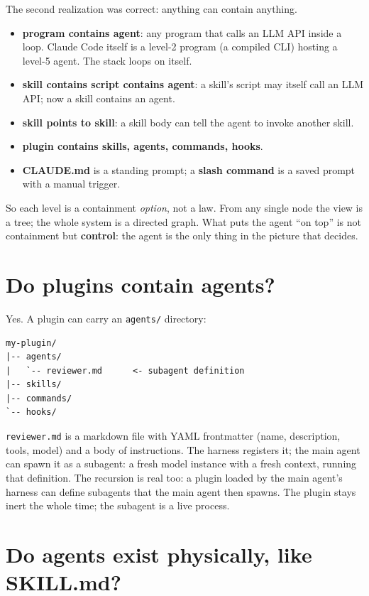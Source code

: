 \documentclass[11pt,a4paper]{article}
\begin{document}
The second realization was correct: anything can contain anything.

\begin{itemize}
  \item \textbf{program contains agent}: any program that calls an LLM API
    inside a loop. Claude Code itself is a level-2 program (a compiled CLI)
    hosting a level-5 agent. The stack loops on itself.
  \item \textbf{skill contains script contains agent}: a skill's script may
    itself call an LLM API; now a skill contains an agent.
  \item \textbf{skill points to skill}: a skill body can tell the agent to
    invoke another skill.
  \item \textbf{plugin contains skills, agents, commands, hooks}.
  \item \textbf{CLAUDE.md} is a standing prompt; a \textbf{slash command} is
    a saved prompt with a manual trigger.
\end{itemize}

So each level is a containment \emph{option}, not a law. From any single
node the view is a tree; the whole system is a directed graph. What puts the
agent ``on top'' is not containment but \textbf{control}: the agent is the
only thing in the picture that decides.

\section{Do plugins contain agents?}

Yes. A plugin can carry an \texttt{agents/} directory:

\begin{verbatim}
my-plugin/
|-- agents/
|   `-- reviewer.md      <- subagent definition
|-- skills/
|-- commands/
`-- hooks/
\end{verbatim}

\texttt{reviewer.md} is a markdown file with YAML frontmatter (name,
description, tools, model) and a body of instructions. The harness
registers it; the main agent can spawn it as a subagent: a fresh model
instance with a fresh context, running that definition. The recursion is
real too: a plugin loaded by the main agent's harness can define subagents
that the main agent then spawns. The plugin stays inert the whole time; the
subagent is a live process.

\section{Do agents exist physically, like SKILL.md?}
\end{document}
